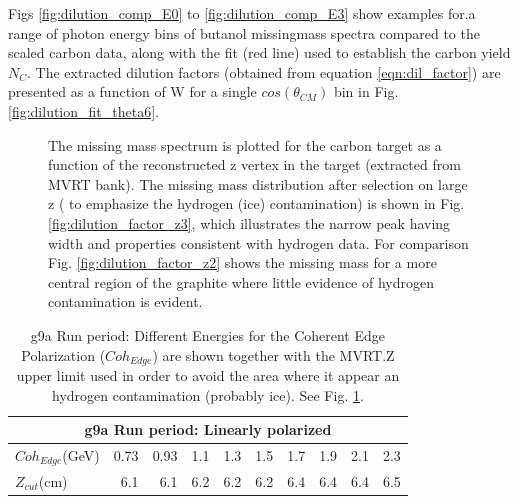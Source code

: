 Figs \ref{fig:dilution_comp_E0} to \ref{fig:dilution_comp_E3} show examples for.a range of photon energy bins  of butanol missingmass spectra  compared to the scaled carbon data, along with the fit (red line) used to establish the carbon yield $N_C$. The extracted dilution factors (obtained from equation \ref{eqn:dil_factor}) are presented as a function of W for a single $cos(\theta_{CM})$ bin in Fig. \ref{fig:dilution_fit_theta6}.
 
\begin{figure}[H]
  \begin{center}
    \qquad
    \qquad

    \caption{The missing mass spectrum is plotted for the carbon target as a function of the reconstructed z vertex in the target (extracted from MVRT bank). The missing mass distribution after selection on large z ( to emphasize the hydrogen (ice) contamination) is shown in Fig. \ref{fig:dilution_factor_z3}, which illustrates the narrow peak having width and properties consistent with hydrogen data. For comparison Fig.  \ref{fig:dilution_factor_z2}  shows the missing mass for a more central region of the graphite where little evidence of hydrogen contamination is evident.}
    \label{fig:dilution_factor_z0}
  \end{center}
\end{figure}

\begin{table}
  \begin{center}
    \begin{tabular}{ ||l|r|r|r|r|r|r|r|r|r||}
      \hline
      \multicolumn{10}{|c|}{g9a Run period: Linearly polarized } \\
      \hline
      $Coh_{Edge}$(GeV)&0.73&0.93&1.1&1.3&1.5&1.7&1.9&2.1&2.3 \\
      \hline
      $Z_{cut}$(cm)&6.1&6.1&6.2&6.2&6.2&6.4&6.4&6.4&6.5 \\
      \hline
    \end{tabular}
  \end{center}
  \caption{g9a Run period: Different Energies for the Coherent Edge Polarization ($Coh_{Edge}$) are shown together with the MVRT.Z upper limit used in order to avoid the area where it appear an hydrogen contamination (probably ice). See Fig. \ref{fig:dilution_factor_z0}.}
  \label{table:dil_factor_zcut}
\end{table}

